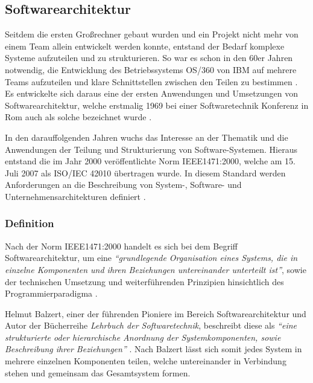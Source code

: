 \subsection{Softwarearchitektur}

Seitdem die ersten Großrechner gebaut wurden und ein Projekt nicht mehr von einem Team allein entwickelt werden konnte, entstand der Bedarf komplexe Systeme aufzuteilen und zu strukturieren. So war es schon in den 60er Jahren notwendig, die Entwicklung des Betriebssystems OS/360 von IBM auf mehrere Teams aufzuteilen und klare Schnittstellen zwischen den Teilen zu bestimmen \parencite{brooks_mythical_1995}. Es entwickelte sich daraus eine der ersten Anwendungen und Umsetzungen von Softwarearchitektur, welche erstmalig 1969 bei einer Softwaretechnik Konferenz in Rom auch als solche bezeichnet wurde \parencite[vgl.][S. 12]{buxton_software_1970}.

In den darauffolgenden Jahren wuchs das Interesse an der Thematik und die Anwendungen der Teilung und Strukturierung von Software-Systemen. Hieraus entstand die im Jahr 2000 veröffentlichte Norm IEEE1471:2000, welche am 15. Juli 2007 als ISO/IEC 42010 übertragen wurde. In diesem Standard werden Anforderungen an die Beschreibung von System-, Software- und Unternehmensarchitekturen definiert \parencite{hilliard_isoiecieee_nodate}.

\subsubsection{Definition}
\label{sec:software-architect-definition}

Nach der Norm IEEE1471:2000 handelt es sich bei dem Begriff Softwarearchitektur, um eine  \textit{\enquote{grundlegende Organisation eines Systems, die in einzelne Komponenten und ihren Beziehungen untereinander unterteilt ist}}, sowie der technischen Umsetzung und weiterführenden Prinzipien hinsichtlich des Programmierparadigma \parencite[][S. 12]{clements_comparing_2005}.

Helmut Balzert, einer der führenden Pioniere im Bereich Softwarearchitektur und Autor der Bücherreihe \textit{Lehrbuch der Softwaretechnik}, beschreibt diese als \textit{\enquote{eine strukturierte oder hierarchische Anordnung der Systemkomponenten, sowie Beschreibung ihrer Beziehungen}} \parencite[][S. 580]{balzert_lehrbuch_2011}. Nach Balzert lässt sich somit jedes System in mehrere einzelnen Komponenten teilen, welche untereinander in Verbindung stehen und gemeinsam das Gesamtsystem formen.


